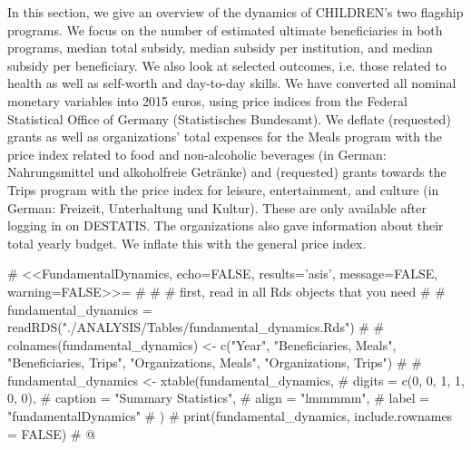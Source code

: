 \documentclass[12pt, a4paper, titlepage]{article}\usepackage[]{graphicx}\usepackage[]{color}
\begin{document}
In this section, we give an overview of the dynamics of CHILDREN's two flagship programs. We focus on the number of estimated ultimate beneficiaries in both programs, median total subsidy, median subsidy per institution, and median subsidy per beneficiary. We also look at selected outcomes, i.e. those related to health as well as self-worth and day-to-day skills. We have converted all nominal monetary variables into 2015 euros, using price indices from the Federal Statistical Office of Germany (Statistisches Bundesamt). We deflate (requested) grants as well as organizations' total expenses for the Meals program  with the price index related to food and non-alcoholic beverages (in German: Nahrungsmittel und alkoholfreie Getränke) and (requested) grants towards the Trips program with the price index for leisure, entertainment, and culture (in German: Freizeit, Unterhaltung und Kultur). These are only available after logging in on DESTATIS. The organizations also gave information about their total yearly budget. We inflate this with the general price index.

# <<FundamentalDynamics, echo=FALSE, results='asis', message=FALSE, warning=FALSE>>=
# 
# # first, read in all Rds objects that you need
# 
# fundamental_dynamics = readRDS("./ANALYSIS/Tables/fundamental_dynamics.Rds")
#  
# colnames(fundamental_dynamics) <- c("Year", "Beneficiaries, Meals", "Beneficiaries, Trips", "Organizations, Meals", "Organizations, Trips")
# 
# fundamental_dynamics <- xtable(fundamental_dynamics,
#                                digits = c(0, 0, 1, 1, 0, 0),
#           caption = "Summary Statistics",
#           align = "lmmmmm", 
#           label = "fundamentalDynamics"
#           )
# print(fundamental_dynamics, include.rownames = FALSE)
# @


\begin{table}[!htbp] \centering 
  \caption{} 
  \label{fundamentalDynamics} 
\end{table} 
\end{document}
